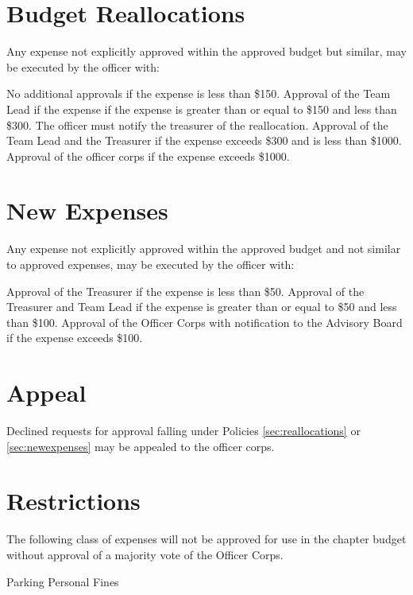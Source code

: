 \documentclass[bylaws,final,10pt,withoutoptional,withoutpreface,officerdoc]{../bylaws}
\begin{document}
\section{Budget Reallocations} Any expense not explicitly approved within the approved budget but similar, may be executed by the officer with:
 \begin{enumsubsection}\label{sec:reallocations}
 	\itemnotoc No additional approvals if the expense is less than \$150. 
	\itemnotoc Approval of the Team Lead if the expense if the expense is greater than or equal to \$150 and less than \$300. The officer must notify the treasurer of the reallocation.
	\itemnotoc Approval of the Team Lead and the Treasurer if the expense exceeds \$300 and is less than \$1000.
	\itemnotoc Approval of the officer corps if the expense exceeds \$1000.
\end{enumsubsection}


\section{New Expenses} Any expense not explicitly approved within the approved budget and not similar to approved expenses, may be executed by the officer with:
 \begin{enumsubsection}\label{sec:newexpenses}
 	\itemnotoc Approval of the Treasurer if the expense is less than \$50.
 	\itemnotoc Approval of the Treasurer and Team Lead if the expense is greater than or equal to \$50 and less than \$100.
	\itemnotoc Approval of the Officer Corps with notification to the Advisory Board if the expense exceeds \$100.
\end{enumsubsection}

\section{Appeal} Declined requests for approval falling under Policies \ref{sec:reallocations} or \ref{sec:newexpenses} may be appealed to the officer corps. 

\section{Restrictions} The following class of expenses will not be approved for use in the chapter budget without approval of a majority vote of the Officer Corps.
\begin{enumsubsection}
\itemnotoc Parking
\itemnotoc Personal Fines
\end{enumsubsection}
\end{document}

